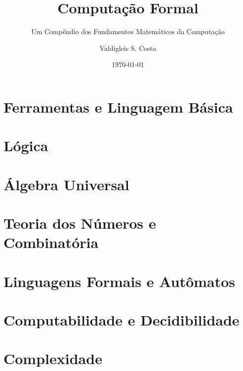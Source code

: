 \documentclass[lang=pt, citestyle=numeric-comp, bibstyle=authoryear, math=newtx, 11pt, fancy]{elegantbook}
\title{Computação Formal}
\subtitle{Um Compêndio dos Fundamentos Matemáticos da Computação}
\author{Valdigleis S. Costa}
\institute{Grupo ALiCIA}
\date{\today}
\begin{document}
	\maketitle
	\frontmatter
	\tableofcontents
	\mainmatter
	
	
	\part{Ferramentas e Linguagem Básica}
	
	
	\part{Lógica}
	\part{Álgebra Universal}
	\part{Teoria dos Números e Combinatória}
	\part{Linguagens Formais e Autômatos}
	
	
	
	\part{Computabilidade e Decidibilidade}
	\part{Complexidade}
	
	
	\printbibliography
	
\end{document}
